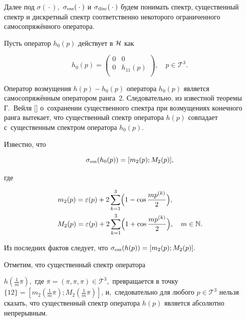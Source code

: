 Далее под $\sigma({}\cdot{}),$ $\sigma_{\rm ess}({}\cdot{})$ и $\sigma_{\rm disc}({}\cdot{})$ будем понимать спектр, существенный спектр и дискретный спектр соответственно некоторого ограниченного самосопряжённого оператора.



Пусть оператор $h_0(p)$  действует в ${\cal{H}}$ как

$$

h_0(p)=\left( \begin{array}{cc}

0 & 0\\

0 & h_{11}(p)\\

\end{array}

\right),\quad p\in {\mathcal T}^3.

$$



Оператор возмущения $h(p)-h_0(p)$ оператора $h_0(p)$ является самосопряжённым оператором ранга~2. Следовательно, из известной теоремы Г.~Вейля [] о~сохранении существенного спектра при возмущениях конечного ранга вытекает, что существенный спектр оператора $h(p)$  совпадает с~существенным спектром оператора $h_0(p)$.

Известно, что 

$$

\sigma_{\rm ess}(h_0(p))=[m_2(p); M_2(p)],

$$

где 

\begin{gather*}

m_2(p) = \varepsilon(p)+2 \sum_{k=1}^3 \Bigl(1 - \cos \frac{m p^{(k)}}{2} \Bigr), \phantom{\quad m\in \mathbb N.}\\

M_2(p) = \varepsilon(p)+2 \sum_{k=1}^3 \Bigl(1 + \cos \frac{m p^{(k)}}{2} \Bigr), \quad m\in \mathbb N.

\end{gather*}

Из последних фактов следует, что $\sigma_{\rm ess}(h(p))=[m_2(p); M_2(p)].$



\smallskip



\begin{remark}

Отметим, что существенный спектр оператора

$h(\frac{1}{m} \overline{\pi}),$ где $ \overline{\pi}=(\pi, \pi,

\pi)\in {\mathcal T}^3,$ превращается в точку $\{12\}=[m_2(\frac{1}{m} \overline{\pi}); M_2(\frac{1}{m} \overline{\pi})]$, и,~следовательно для любого $p\in {\mathcal T}^3$ нельзя сказать, что существенный спектр оператора $h(p)$ является абсолютно непрерывным.

\end{remark}




